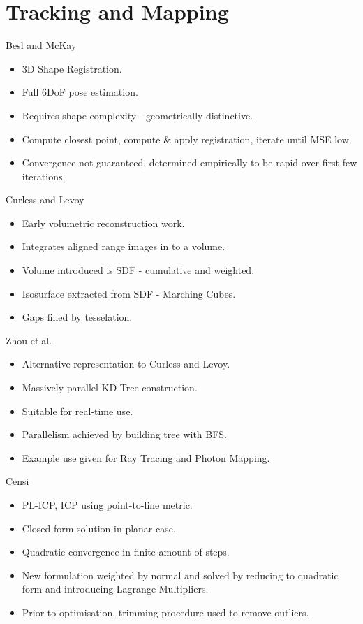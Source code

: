 \section{Tracking and Mapping}
\label{sec:lit_review_tam}
Besl and McKay \cite{Besl1992}
\begin{itemize}
	\item 3D Shape Registration.
	\item Full 6DoF pose estimation.
	\item Requires shape complexity - geometrically distinctive.
	\item Compute closest point, compute \& apply registration, iterate until MSE low. 
	\item Convergence not guaranteed, determined empirically to be rapid over first few iterations.
\end{itemize}

Curless and Levoy \cite{Curless1996}
\begin{itemize}
	\item Early volumetric reconstruction work.
	\item Integrates aligned range images in to a volume.
	\item Volume introduced is SDF - cumulative and weighted.
	\item Isosurface extracted from SDF - Marching Cubes.
	\item Gaps filled by tesselation.
\end{itemize}

Zhou et.al. \cite{Zhou2008}
\begin{itemize}
	\item Alternative representation to Curless and Levoy.
	\item Massively parallel KD-Tree construction.
	\item Suitable for real-time use.
	\item Parallelism achieved by building tree with BFS.
	\item Example use given for Ray Tracing and Photon Mapping.
\end{itemize}

Censi \cite{Censi2008}
\begin{itemize}
	\item PL-ICP, ICP using point-to-line metric.
	\item Closed form solution in planar case.
	\item Quadratic convergence in finite amount of steps.
	\item New formulation weighted by normal and solved by reducing to quadratic form and introducing Lagrange Multipliers.
	\item Prior to optimisation, trimming procedure used to remove outliers.
\end{itemize}

